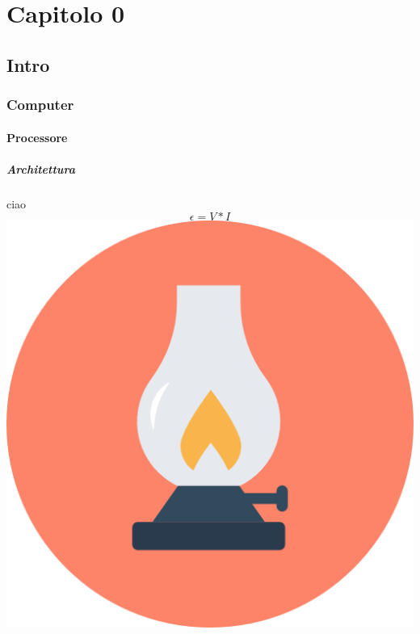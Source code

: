 \newpage
\section{Capitolo 0}
\subsection{Intro}
\subsubsection{Computer}
\paragraph{Processore}
\subparagraph{Architettura}
ciao $$ \epsilon = V * I $$
\includegraphics[scale=0.5]{Immagini/icon.png}
